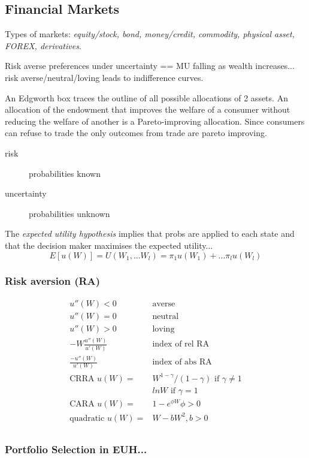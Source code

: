 
\subsection*{Financial Markets}
Types of markets: \emph{equity/stock, bond, money/credit, commodity, physical
asset, FOREX, derivatives}.

Risk averse preferences under uncertainty == MU falling as wealth increases...
risk averse/neutral/loving leads to indifference curves.

An Edgworth box traces the outline of all possible allocations of 2 assets. An
allocation of the endowment that improves the welfare of a consumer without
reducing the welfare of another is a Pareto-improving allocation. Since
consumers can refuse to trade the only outcomes from trade are pareto
improving. 

\begin{description}
\item[risk] probabilities known
\item[uncertainty] probabilities unknown
\end{description}
The \emph{expected utility hypothesis} implies that probs are applied to each
state and that the decision maker maximises the expected utility...
\[E[u(W)]=U(W_1,...W_l)=\pi_1u(W_1)+...\pi_lu(W_l)\]
\subsubsection*{Risk aversion (RA)}
\[
\begin{array}{rl}
u''(W) < 0 &\mbox{averse}\\
u''(W) = 0 &\mbox{neutral}\\
u''(W) > 0 &\mbox{loving}\\
-W\frac{u''(W)}{u'(W)} &\mbox{index of rel RA}\\
\frac{-u''(W)}{u'(W)} &\mbox{index of abs RA}\\
\mbox{CRRA }u(W) =  &W^{1-\gamma}/(1-\gamma) \mbox{ if } \gamma \ne 1\\
                    &lnW \mbox{ if } \gamma = 1\\
\mbox{CARA }u(W) =& 1-e^{\phi W} \phi > 0\\
\mbox{quadratic }u(W) =&W - bW^2, b>0\\
\end{array}
\]

\subsubsection*{Portfolio Selection in EUH...}

